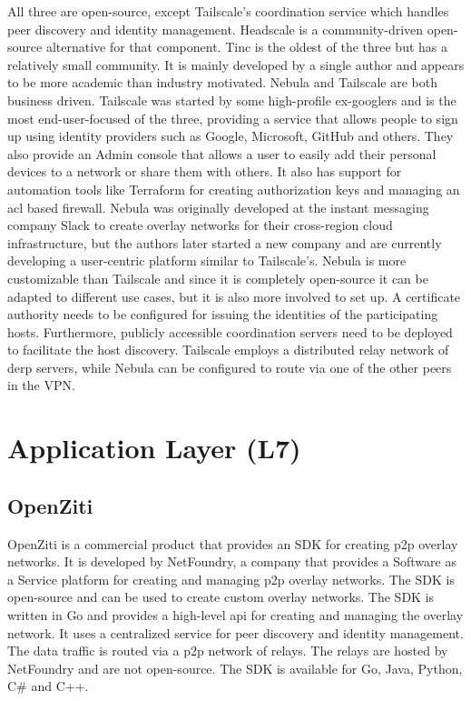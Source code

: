 All three are open-source, except Tailscale's coordination service which handles peer discovery and identity management. Headscale \autocite{fontJuanfontHeadscale2022} is a community-driven open-source alternative for that component. Tinc is the oldest of the three but has a relatively small community. It is mainly developed by a single author and appears to be more academic than industry motivated.
Nebula and Tailscale are both business driven. Tailscale was started by some high-profile ex-googlers and is the most end-user-focused of the three, providing a service that allows people to sign up using identity providers such as Google, Microsoft, GitHub and others. They also provide an Admin console that allows a user to easily add their personal devices to a network or share them with others. It also has support for automation tools like Terraform for creating authorization keys and managing an \gls{acl} based firewall.
Nebula was originally developed at the instant messaging company Slack to create overlay networks for their cross-region cloud infrastructure, but the authors later started a new company and are currently developing a user-centric platform similar to Tailscale's. Nebula is more customizable than Tailscale and since it is completely open-source it can be adapted to different use cases, but it is also more involved to set up. A certificate authority needs to be configured for issuing the identities of the participating hosts. Furthermore, publicly accessible coordination servers need to be deployed to facilitate the host discovery.
Tailscale employs a distributed relay network of \gls{derp} servers, while Nebula can be configured to route via one of the other peers in the VPN.

\section{Application Layer (L7)}\label{thesis__022-overlays.md__application-layer-l7}

\subsection{OpenZiti}\label{thesis__022-overlays.md__openziti}

OpenZiti is a commercial product that provides an SDK for creating \gls{p2p} overlay networks. It is developed by NetFoundry, a company that provides a Software as a Service platform for creating and managing \gls{p2p} overlay networks. The SDK is open-source and can be used to create custom overlay networks. The SDK is written in Go and provides a high-level \gls{api} for creating and managing the overlay network. It uses a centralized service for peer discovery and identity management. The data traffic is routed via a \gls{p2p} network of relays. The relays are hosted by NetFoundry and are not open-source. The SDK is available for Go, Java, Python, C\# and C++.

